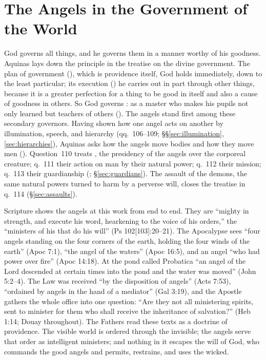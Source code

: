 \section{The Angels in the Government of the World}\label{sec:government}

God governs all things, and he governs them in a manner worthy of his
goodness. Aquinas lays down the principle in the treatise on the divine
government. The plan of government (), which is
providence itself, God holds immediately, down to the least particular; its
execution () he carries out in part through other things,
because it is a greater perfection for a thing to be good in itself and
also a cause of goodness in others. So God governs : as
a master who makes his pupils not only learned but teachers of others
(). The angels stand first among these secondary
governors. Having shown how one angel acts on another by illumination,
speech, and hierarchy (qq.~106--109; \S\S\ref{sec:illumination},
\ref{sec:hierarchies}), Aquinas asks how the angels move bodies and how they
move men (). Question~110 treats , the presidency of the angels over the
corporeal creature; q.~111 their action on man by their natural power;
q.~112 their mission; q.~113 their guardianship (;
\S\ref{sec:guardians}). The assault of the demons, the same natural powers
turned to harm by a perverse will, closes the treatise in q.~114
(\S\ref{sec:assaults}).

Scripture shows the angels at this work from end to end. They are
``mighty in strength, and execute his word, hearkening to the voice of his
orders,'' the ``ministers of his that do his will'' (Ps 102[103]:20--21).
The Apocalypse sees ``four angels standing on the four corners of the
earth, holding the four winds of the earth'' (Apoc 7:1), ``the angel of the
waters'' (Apoc 16:5), and an angel ``who had power over fire'' (Apoc
14:18). At the pond called Probatica ``an angel of the Lord descended at certain
times into the pond and the water was moved'' (John 5:2--4). The Law
was received ``by the disposition of angels'' (Acts 7:53), ``ordained by
angels in the hand of a mediator'' (Gal 3:19), and the Apostle gathers the
whole office into one question: ``Are they not all ministering spirits,
sent to minister for them who shall receive the inheritance of
salvation?'' (Heb 1:14; Douay throughout). The Fathers read these texts as
a doctrine of providence. The visible world is ordered through the
invisible; the angels serve that order as intelligent ministers; and
nothing in it escapes the will of God, who commands the good angels and
permits, restrains, and uses the wicked.

